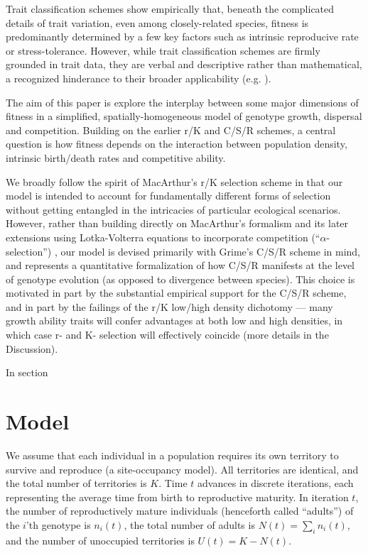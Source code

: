 \documentclass[11pt]{article}
\begin{document}
Trait classification schemes show empirically that, beneath the complicated details of trait variation, even among closely-related species, fitness is predominantly determined by a few key factors such as intrinsic reproducive rate or stress-tolerance. However, while trait classification schemes are firmly grounded in trait data, they are verbal and descriptive rather than mathematical, a recognized hinderance to their broader applicability (e.g. \citep{tilman_2007}). 

The aim of this paper is explore the interplay between some major dimensions of fitness in a simplified, spatially-homogeneous model of genotype growth, dispersal and competition. Building on the earlier r/K and C/S/R schemes, a central question is how fitness depends on the interaction between population density, intrinsic birth/death rates and competitive ability. 

We broadly follow the spirit of MacArthur's r/K selection scheme in that our model is intended to account for fundamentally different forms of selection without getting  entangled in the intricacies of particular ecological scenarios. However, rather than building directly on MacArthur's formalism and its later extensions using Lotka-Volterra equations to incorporate competition (``$\alpha$-selection'') \citep{gill_1974,case_1974,joshi_2001}, our model is devised primarily with Grime's C/S/R scheme in mind, and represents a quantitative formalization of how C/S/R manifests at the level of genotype evolution (as opposed to divergence between species). This choice is motivated in part by the substantial empirical support for the C/S/R scheme, and in part by the failings of the r/K low/high density dichotomy --- many growth ability traits will confer advantages at both low and high densities, in which case r- and K- selection will effectively coincide (more details in the Discussion). 

In section
 

\section*{Model}\label{sec:model}

We assume that each individual in a population requires its own territory to survive and reproduce (a site-occupancy model). All territories are identical, and the total number of territories is $K$. Time $t$ advances in discrete iterations, each representing the average time from birth to reproductive maturity. In iteration $t$, the number of reproductively mature individuals (henceforth called ``adults'') of the $i$'th genotype is $n_i(t)$, the total number of adults is $N(t)=\sum_i n_i(t)$, and the number of unoccupied territories is $U(t)=K-N(t)$. 
\end{document}
